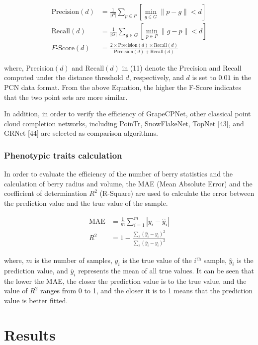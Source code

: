 \documentclass[12pt]{article}
\begin{document}
\begin{align}
    \text{Precision}(d) &= \frac{1}{|P|} \sum_{p \in P} \left[ \min_{g \in G} \|p - g\| < d \right] \tag{9}\\
    \text{Recall}(d) &= \frac{1}{|G|} \sum_{g \in G} \left[ \min_{p \in P} \|g - p\| < d \right] \tag{10}\\
    F\text{-Score}(d) &= \frac{2 \times \text{Precision}(d) \times \text{Recall}(d)}{\text{Precision}(d) + \text{Recall}(d)} \tag{11}
\end{align}

{\raggedright where, Precision$(d)$ and Recall$(d)$ in (11) denote the Precision and Recall computed under the distance threshold $d$, respectively, and $d$ is set to $0.01$ in the PCN data format. 
From the above Equation, the higher the F-Score indicates that the two point sets are more similar.}

In addition, in order to verify the efficiency of GrapeCPNet, other classical point cloud completion networks, including PoinTr, SnowFlakeNet, TopNet [43], and GRNet [44] are selected as comparison algorithms. 

\subsubsection{Phenotypic traits calculation}

In order to evaluate the efficiency of the number of berry statistics and the calculation of berry radius and volume, the MAE (Mean Absolute Error) and the coefficient of determination $R^2$ (R-Square) are used to calculate the error between the prediction value and the true value of the sample.

\begin{align}
    \text{MAE} &= \frac{1}{m} \sum_{i=1}^{m} |y_i - \hat{y}_i| \tag{12}\\
    R^2 &= 1 - \frac{\sum_{i} (\hat{y}_i - y_i)^2}{\sum_{i} (\bar{y}_i - y_i)^2} \tag{13}
\end{align}

{\raggedright where, $m$ is the number of samples, $y_i$ is the true value of the $i^{\text{th}}$ sample, $\hat{y}_i$ is the prediction value, and $\bar{y}_i$ represents the mean of all true values. 
It can be seen that the lower the MAE, the closer the prediction value is to the true value, and the value of $R^2$ ranges from 0 to 1, and the closer it is to 1 means that the prediction value is better fitted.}

\section{Results}
\end{document}
